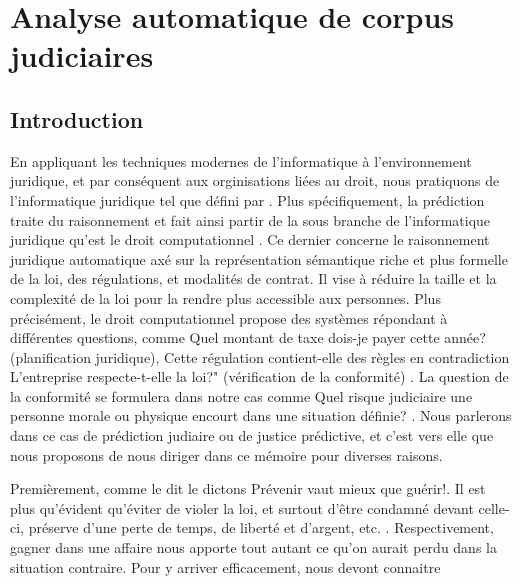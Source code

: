 \chapter{Analyse automatique de corpus judiciaires}
\label{chap:literature}



\section{Introduction}
En appliquant les techniques modernes de l'informatique à l'environnement juridique, et par conséquent aux orginisations liées au droit, nous pratiquons de l'\og informatique juridique \fg{} tel que défini par \citet{erdelez1997legalinformatics}. Plus spécifiquement, la prédiction traite du raisonnement et fait ainsi partir de la sous branche de  l'\og informatique juridique \fg{} qu'est le \og droit computationnel \fg{}. Ce dernier concerne le raisonnement juridique automatique  axé sur la représentation sémantique riche et plus formelle de la loi, des régulations, et modalités de contrat. Il vise à réduire la taille et la complexité de la loi pour la rendre plus accessible aux personnes. Plus précisément, le \og droit computationnel \fg{} propose des systèmes répondant à différentes questions, comme \og Quel montant de taxe dois-je payer cette année? \fg{} (planification juridique), \og Cette régulation contient-elle des règles en contradiction\fg{} \og L'entreprise respecte-t-elle la loi?" (vérification de la conformité) \citep{Genesereth2015computationallaw}. La question de la conformité se formulera dans notre cas comme \og Quel risque judiciaire une personne morale ou physique encourt dans une situation définie? \fg{}. Nous parlerons dans ce cas de prédiction judiaire ou de justice prédictive, et c'est vers elle que nous proposons de nous diriger dans ce mémoire pour diverses raisons.

Premièrement, comme le dit le dictons \og Prévenir vaut mieux que guérir!\fg{}. Il est plus qu'évident qu'éviter de violer la loi, et surtout d'être condamné devant celle-ci, préserve d'une perte de temps, de liberté et d'argent, etc. . Respectivement, \og gagner dans une affaire \fg{} nous apporte tout autant ce qu'on aurait perdu dans la situation contraire.   Pour y arriver efficacement, nous devont connaitre 


